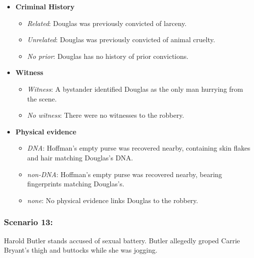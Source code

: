 \documentclass[
]{article}
\providecommand{\tightlist}{%
  \setlength{\itemsep}{0pt}\setlength{\parskip}{0pt}}
\begin{document}
\begin{itemize}
\tightlist
\item
  \textbf{Criminal History}

  \begin{itemize}
  \tightlist
  \item
    \emph{Related}: Douglas was previously convicted of larceny.
  \item
    \emph{Unrelated}: Douglas was previously convicted of animal
    cruelty.
  \item
    \emph{No prior}: Douglas has no history of prior convictions.
  \end{itemize}
\item
  \textbf{Witness}

  \begin{itemize}
  \tightlist
  \item
    \emph{Witness}: A bystander identified Douglas as the only man
    hurrying from the scene.
  \item
    \emph{No witness}: There were no witnesses to the robbery.
  \end{itemize}
\item
  \textbf{Physical evidence}

  \begin{itemize}
  \tightlist
  \item
    \emph{DNA}: Hoffman's empty purse was recovered nearby, containing
    skin flakes and hair matching Douglas's DNA.
  \item
    \emph{non-DNA}: Hoffman's empty purse was recovered nearby, bearing
    fingerprints matching Douglas's.
  \item
    \emph{none}: No physical evidence links Douglas to the robbery.
  \end{itemize}
\end{itemize}

\hypertarget{scenario-13}{%
\subsubsection{Scenario 13:}\label{scenario-13}}

Harold Butler stands accused of sexual battery. Butler allegedly groped
Carrie Bryant's thigh and buttocks while she was jogging.
\end{document}
